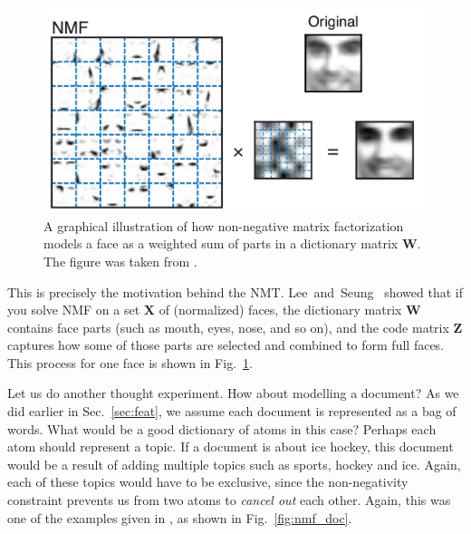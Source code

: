 \documentclass{report}
\newcommand{\matr}[1]{\mathbf{#1}}
\newcommand{\mW}[0]{\matr{W}}
\newcommand{\mZ}[0]{\matr{Z}}
\newcommand{\mX}[0]{\matr{X}}
\begin{document}
\begin{figure}[t]
    \centering
    \begin{minipage}{0.59\columnwidth}
        \centering
        \includegraphics[width=\columnwidth]{figures/nmf.png}
    \end{minipage}
    \begin{minipage}{0.4\columnwidth}
        \caption{
            \label{fig:nmf}
            A graphical illustration of how non-negative matrix factorization
            models a face as a weighted sum of parts in a dictionary matrix
            $\mW$. The figure was taken from \cite{lee2001algorithms}.
        }
    \end{minipage}
\end{figure}

This is precisely the motivation behind the NMT.
Lee~and~Seung~\cite{lee2001algorithms} showed that if you solve NMF on a set
$\mX$ of (normalized) faces, the dictionary matrix $\mW$ contains face parts
(such as mouth, eyes, nose, and so on), and the code matrix $\mZ$ captures how
some of those parts are selected and combined to form full faces. This process
for one face is shown in Fig.~\ref{fig:nmf}.

Let us do another thought experiment. How about modelling a document? As we did
earlier in Sec.~\ref{sec:feat}, we assume each document is represented as a bag
of words. What would be a good dictionary of atoms in this case? Perhaps each
atom should represent a topic. If a document is about ice hockey, this document
would be a result of adding multiple topics such as sports, hockey and ice.
Again, each of these topics would have to be exclusive, since the non-negativity
constraint prevents us from two atoms to {\it cancel out} each other. Again,
this was one of the examples given in \cite{lee2001algorithms}, as shown in
Fig.~\ref{fig:nmf_doc}.
\end{document}
